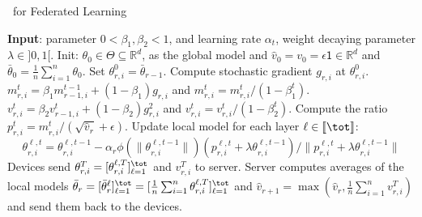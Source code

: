 \documentclass[11pt]{article}
\begin{document}
\begin{algorithm}[H]
\caption{\algo\ for Federated Learning} \label{alg:ldams}
\begin{algorithmic}[1]
\STATE \textbf{Input}: parameter $0< \beta_1, \beta_2 <1$, and learning rate $\alpha_t$, weight decaying parameter $\lambda \in ]0,1[$.
\STATE Init: $\theta_{0} \in \Theta \subseteq \mathbb R^d $, as the global model and $\hat v_0=v_{0} = \epsilon \mathsf{1} \in \mathbb R^{d}$ and $\bar{\theta}_0 =  \frac{1}{n} \sum_{i=1}^n \theta_0$.
\STATE Set $\theta_{r,i}^{0} = \bar{\theta}_{r-1}$.
\STATE Compute stochastic gradient $g_{r,i}$ at $\theta_{r,i}^{0}$.
\STATE $m^t_{r,i} = \beta_1 m^{t-1}_{r-1,i} + (1 - \beta_1) g_{r,i}$ and $m^{t}_{r,i}=m^{t}_{r,i} /\left(1-\beta_{1}^{t}\right)$. \label{line:first}
\STATE $v^{t}_{r,i} = \beta_2 v^{t}_{r-1,i} + (1 - \beta_2) g_{r,i}^2$ and $v^{t}_{r,i}=v^{t}_{r,i} /\left(1-\beta_{2}^{t}\right)$. \label{line:second}
\STATE Compute the ratio  $p_{r,i}^t=m^{t}_{r,i}/(\sqrt{\hat v_{r}}+\epsilon)$. \label{line:scale}
\STATE Update local model for each layer $\ell \in \llbracket \tot \rrbracket$: \label{line:layer}
$$\theta_{r,i}^{\ell,t}=\theta_{r,i}^{\ell,t-1}-\alpha_{r} \phi(\|\theta_{r,i}^{\ell,t-1}\|)(p_{r,i}^{\ell,t}+\lambda \theta_{r,i}^{\ell,t-1})/ \|p_{r,i}^{\ell,t}+\lambda \theta_{r,i}^{\ell,t-1}\|$$
\ENDFOR
\STATE Devices send $\theta_{r,i}^{T} = [\theta_{r,i}^{\ell,T}]_{\ell =1}^{\tot}$ and $v_{r,i}^T$ to server.
\ENDFOR
\STATE Server computes averages of the local models $\bar{\theta}_r = [\bar{\theta}_r^\ell]_{\ell =1}^{\tot} = [\frac{1}{n} \sum_{i=1}^n \theta_{r,i}^{\ell,T}]_{\ell =1}^{\tot}$ and $\hat{v}_{r+1} = \max( \hat{v}_{r},\frac{1}{n} \sum_{i=1}^n v^T_{r,i} )$ and send them back to the devices. \label{line:final}
\ENDFOR
\end{algorithmic}
\end{algorithm}
\end{document}
